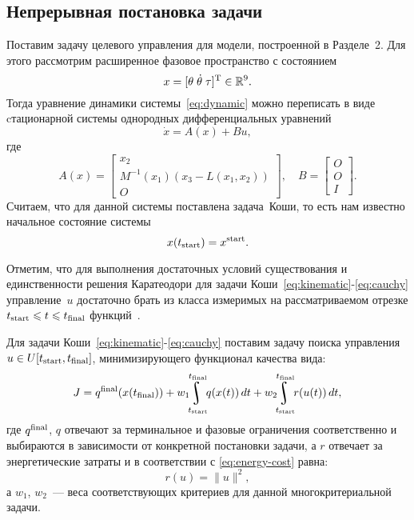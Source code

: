 \documentclass[../../doc.tex]{subfiles}
\begin{document}
    \subsection{Непрерывная постановка задачи}
    
    Поставим задачу целевого управления для модели, построенной в Разделе~2.
    Для этого рассмотрим расширенное фазовое пространство с состоянием
    \begin{equation*}
        x = [\theta\;\dot\theta\;\tau]^\textnormal{T} \in \mathbb{R}^9.
    \end{equation*}
    Тогда уравнение динамики системы~\eqref{eq:dynamic} можно переписать в виде cтационарной системы однородных дифференциальных уравнений
    \begin{equation}\label{eq:kinematic}
        \dot x = A(x) + Bu,
    \end{equation}
    где 
    $$
        A(x) = \begin{bmatrix}
            x_2 \\
            M^{-1}(x_1)(x_3 - L(x_1, x_2)) \\
            O
        \end{bmatrix}
        ,\quad
        B = \begin{bmatrix}
            O \\
            O \\
            I
        \end{bmatrix}.
    $$
    Считаем, что для данной системы поставлена задача~Коши, то есть нам известно начальное состояние системы
    \begin{equation}\label{eq:cauchy}
        x(t_{\textnormal{start}}) = x^{\textnormal{start}}.
    \end{equation}

    \begin{remark}
        Отметим,
        что для выполнения достаточных условий существования и единственности решения Каратеодори для задачи Коши~\eqref{eq:kinematic}-\eqref{eq:cauchy}
        управление~$u$ достаточно брать из класса измеримых на рассматриваемом отрезке $t_{\textnormal{start}}\leqslant t \leqslant t_{\textnormal{final}}$ функций~\cite{filippov1985}.
    \end{remark}

    Для задачи Коши~\eqref{eq:kinematic}-\eqref{eq:cauchy} поставим задачу поиска управления $u \in U[t_{\textnormal{start}},t_{\textnormal{final}}]$, минимизирующего функционал качества вида:
    \begin{equation}\label{eq:continuos-cost}
        J = q^{\textnormal{final}}(x(t_{\textnormal{final}})) + w_1 \!\! \uint\limits_{t_{\textnormal{start}}}^{t_{\textnormal{final}}} \!\! q(x(t))\,dt + w_2 \!\! \uint\limits_{t_{\textnormal{start}}}^{t_{\textnormal{final}}} \!\! r(u(t))\,dt,
    \end{equation}
    где $q^{\textnormal{final}}$, $q$ отвечают за терминальное и фазовые ограничения соответственно и выбираются в зависимости от конкретной постановки задачи, а $r$ отвечает за энергетические затраты и в соответствии с \eqref{eq:energy-cost} равна:
    $$
        r(u) = \|u\|^2,
    $$
    а $w_1$, $w_2$~--- веса соответствующих критериев для данной многокритериальной задачи.
\end{document}
